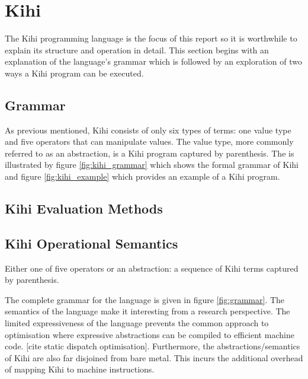 
\section{Kihi}
The Kihi programming language is the focus of this report so it is worthwhile to explain its structure and operation in detail. This section begins with an explanation of the language's grammar which is followed by an exploration of two ways a Kihi program can be executed.

\subsection{Grammar}
As previous mentioned, Kihi consists of only six types of terms: one value type and five operators that can manipulate values. The value type, more commonly referred to as an abstraction, is a Kihi program captured by parenthesis. The is illustrated by figure \ref{fig:kihi_grammar} which shows the formal grammar of Kihi and figure \ref{fig:kihi_example} which provides an example of a Kihi program.




\subsection{Kihi Evaluation Methods}

\subsection{Kihi Operational Semantics}



Either
one of five operators or an abstraction: a sequence of Kihi terms
captured by parenthesis. 

The complete grammar for the language is given
in figure \ref{fig:grammar}. The semantics of the language make it
interesting from a research perspective. The limited expressiveness of
the language prevents the common approach to optimisation where expressive
abstractions can be compiled to efficient machine code. [cite static
dispatch optimisation]. Furthermore, the abstractions/semantics of Kihi are
also far disjoined from bare metal. This incurs the additional overhead of
mapping Kihi to machine instructions.

